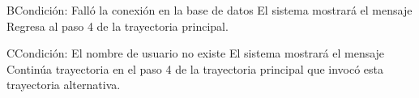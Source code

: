 	\begin{UCtrayectoriaA}{B}{Condición: Falló la conexión en la base de datos}
		\UCpaso[\UCsist] El sistema mostrará el mensaje 
		\UCpaso[\UCsist] Regresa al paso 4 de la trayectoria principal. 
	\end{UCtrayectoriaA}
	\begin{UCtrayectoriaA}{C}{Condición: El nombre de usuario no existe}
		\UCpaso[\UCsist] El sistema mostrará el mensaje 
		\UCpaso[\UCsist] Continúa trayectoria en el paso 4 de la trayectoria  principal que invocó esta trayectoria alternativa. 
	\end{UCtrayectoriaA}
